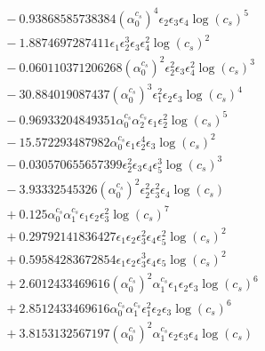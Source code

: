 \documentclass[10pt]{article}
\begin{document}
\begin{align*}
&{}  - 0.93868585738384 \left(\alpha_{0}^{c_s}\right)^{4} \epsilon_{2} \epsilon_{3} \epsilon_{4} \log{\left(c_{s} \right)}^{5} \\
&{}  - 1.8874697287411 \epsilon_{1} \epsilon_{2}^{3} \epsilon_{3} \epsilon_{4}^{2} \log{\left(c_{s} \right)}^{2} \\
&{}  - 0.060110371206268 \left(\alpha_{0}^{c_s}\right)^{2} \epsilon_{2}^{2} \epsilon_{3} \epsilon_{4}^{2} \log{\left(c_{s} \right)}^{3} \\
&{}  - 30.884019087437 \left(\alpha_{0}^{c_s}\right)^{3} \epsilon_{1}^{2} \epsilon_{2} \epsilon_{3} \log{\left(c_{s} \right)}^{4} \\
&{}  - 0.96933204849351 \alpha_{0}^{c_s} \alpha_{2}^{c_s} \epsilon_{1} \epsilon_{2}^{2} \log{\left(c_{s} \right)}^{5} \\
&{}  - 15.572293487982 \alpha_{0}^{c_s} \epsilon_{1} \epsilon_{2}^{4} \epsilon_{3} \log{\left(c_{s} \right)}^{2} \\
&{}  - 0.030570655657399 \epsilon_{2}^{2} \epsilon_{3} \epsilon_{4} \epsilon_{5}^{3} \log{\left(c_{s} \right)}^{3} \\
&{}  - 3.93332545326 \left(\alpha_{0}^{c_s}\right)^{2} \epsilon_{2}^{2} \epsilon_{3}^{2} \epsilon_{4} \log{\left(c_{s} \right)} \\
&{}  + 0.125 \alpha_{0}^{c_s} \alpha_{1}^{c_s} \epsilon_{1} \epsilon_{2} \epsilon_{3}^{2} \log{\left(c_{s} \right)}^{7} \\
&{}  + 0.29792141836427 \epsilon_{1} \epsilon_{2} \epsilon_{3}^{2} \epsilon_{4} \epsilon_{5}^{2} \log{\left(c_{s} \right)}^{2} \\
&{}  + 0.59584283672854 \epsilon_{1} \epsilon_{2} \epsilon_{3}^{3} \epsilon_{4} \epsilon_{5} \log{\left(c_{s} \right)}^{2} \\
&{}  + 2.6012433469616 \left(\alpha_{0}^{c_s}\right)^{2} \alpha_{1}^{c_s} \epsilon_{1} \epsilon_{2} \epsilon_{3} \log{\left(c_{s} \right)}^{6} \\
&{}  + 2.8512433469616 \alpha_{0}^{c_s} \alpha_{1}^{c_s} \epsilon_{1}^{2} \epsilon_{2} \epsilon_{3} \log{\left(c_{s} \right)}^{6} \\
&{}  + 3.8153132567197 \left(\alpha_{0}^{c_s}\right)^{2} \alpha_{1}^{c_s} \epsilon_{2} \epsilon_{3} \epsilon_{4} \log{\left(c_{s} \right)}
\end{align*}
\end{document}
